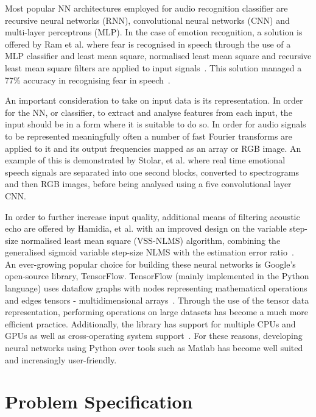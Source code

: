 \documentclass[10pt,twocolumn]{witseiepaper}
\begin{document}
Most popular NN architectures employed for audio recognition classifier are recursive neural networks (RNN), convolutional neural networks (CNN) and multi-layer perceptrons  (MLP). In the case of emotion recognition, a solution is offered by Ram et al. where fear is recognised in speech through the use of a MLP classifier and least mean square, normalised least mean square and recursive least mean square filters are applied to input signals~\cite{fearMLP}. This solution managed a 77\% accuracy in recognising fear in speech~\cite{fearMLP}. 

An important consideration to take on input data is its representation. In order for the NN, or classifier, to extract and analyse features from each input, the input should be in a form where it is suitable to do so. In order for audio signals to be represented meaningfully often a number of fast Fourier transforms are applied to it and its output frequencies mapped as an array or RGB image. An example of this is demonstrated by Stolar, et al. where real time emotional speech signals are separated into one second blocks, converted to spectrograms and then RGB images, before being analysed using a five convolutional layer CNN\cite{RGB}.

In order to further increase input quality, additional means of filtering acoustic echo are offered by Hamidia, et al. with an improved design on the variable step-size normalised least mean square (VSS-NLMS) algorithm, combining the generalised sigmoid variable step-size NLMS with the estimation error ratio~\cite{echo}.
\hfill\\

An ever-growing popular choice for building these neural networks is Google's open-source library, TensorFlow. TensorFlow (mainly implemented in the Python language) uses dataflow graphs with nodes representing mathematical operations and edges tensors - multidimensional arrays~\cite{tensorIntro}. Through the use of the tensor data representation, performing operations on large datasets has become a much more efficient practice. Additionally, the library has support for multiple CPUs and GPUs as well as cross-operating system support~\cite{tensorIntro}. For these reasons, developing neural networks using Python over tools such as Matlab has become well suited and increasingly user-friendly. 

\section{Problem Specification}\label{sec:spec}
\end{document}
